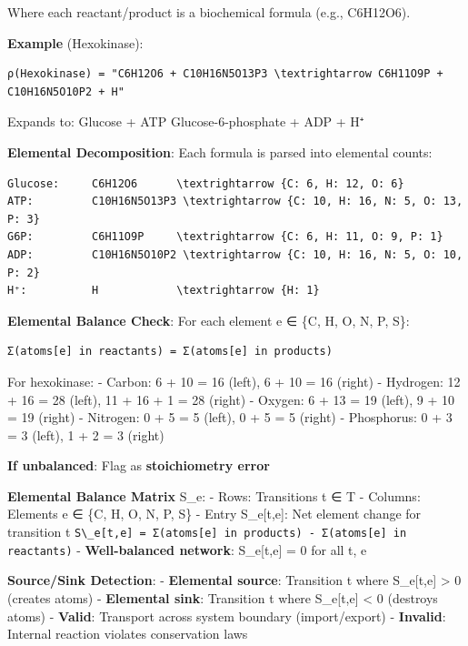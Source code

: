 Where each reactant/product is a biochemical formula (e.g., C6H12O6).

\textbf{Example} (Hexokinase):

\begin{lstlisting}
ρ(Hexokinase) = "C6H12O6 + C10H16N5O13P3 \textrightarrow C6H11O9P + C10H16N5O10P2 + H"
\end{lstlisting}

Expands to: Glucose + ATP \textrightarrow Glucose-6-phosphate + ADP + H⁺

\textbf{Elemental Decomposition}: Each formula is parsed into elemental
counts:

\begin{lstlisting}
Glucose:     C6H12O6      \textrightarrow {C: 6, H: 12, O: 6}
ATP:         C10H16N5O13P3 \textrightarrow {C: 10, H: 16, N: 5, O: 13, P: 3}
G6P:         C6H11O9P     \textrightarrow {C: 6, H: 11, O: 9, P: 1}
ADP:         C10H16N5O10P2 \textrightarrow {C: 10, H: 16, N: 5, O: 10, P: 2}
H⁺:          H            \textrightarrow {H: 1}
\end{lstlisting}

\textbf{Elemental Balance Check}: For each element e ∈ \{C, H, O, N, P,
S\}:

\begin{lstlisting}
Σ(atoms[e] in reactants) = Σ(atoms[e] in products)
\end{lstlisting}

For hexokinase: - Carbon: 6 + 10 = 16 (left), 6 + 10 = 16 (right) \checkmark -
Hydrogen: 12 + 16 = 28 (left), 11 + 16 + 1 = 28 (right) \checkmark - Oxygen: 6 +
13 = 19 (left), 9 + 10 = 19 (right) \checkmark - Nitrogen: 0 + 5 = 5 (left), 0 +
5 = 5 (right) \checkmark - Phosphorus: 0 + 3 = 3 (left), 1 + 2 = 3 (right) \checkmark

\textbf{If unbalanced}: Flag as \textbf{stoichiometry error}

\textbf{Elemental Balance Matrix} S\_e: - Rows: Transitions t ∈ T -
Columns: Elements e ∈ \{C, H, O, N, P, S\} - Entry S\_e{[}t,e{]}: Net
element change for transition t
\passthrough{\lstinline!S\_e[t,e] = Σ(atoms[e] in products) - Σ(atoms[e] in reactants)!}
- \textbf{Well-balanced network}: S\_e{[}t,e{]} = 0 for all t, e

\textbf{Source/Sink Detection}: - \textbf{Elemental source}: Transition
t where S\_e{[}t,e{]} \textgreater{} 0 (creates atoms) -
\textbf{Elemental sink}: Transition t where S\_e{[}t,e{]} \textless{} 0
(destroys atoms) - \textbf{Valid}: Transport across system boundary
(import/export) - \textbf{Invalid}: Internal reaction violates
conservation laws

